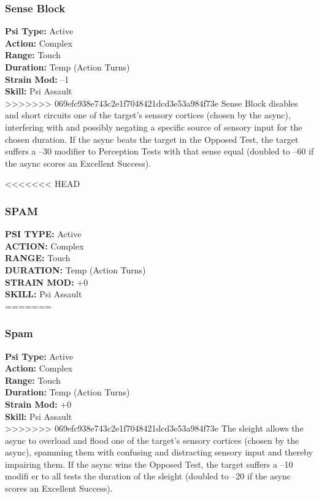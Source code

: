\subsubsection{Sense Block}
\textbf{Psi Type:} Active \\ 
\textbf{Action:} Complex \\ 
\textbf{Range:} Touch \\ 
\textbf{Duration:} Temp (Action Turns) \\
\textbf{Strain Mod:} –1 \\ 
\textbf{Skill:} Psi Assault \\
>>>>>>> 069efc938e743c2e1f7048421dcd3e53a984f73e
Sense Block disables and short circuits one of the target’s
sensory cortices (chosen by the async), interfering
with and possibly negating a specific source of sensory
input for the chosen duration. If the async beats the
target in the Opposed Test, the target suffers a –30
modifier to Perception Tests with that sense equal (doubled
to –60 if the async scores an Excellent Success).


<<<<<<< HEAD
\subsubsection{SPAM}
\textbf{PSI TYPE:} Active \\ 
\textbf{ACTION:} Complex \\ 
\textbf{RANGE:} Touch \\ 
\textbf{DURATION:} Temp (Action Turns) \\
\textbf{STRAIN MOD:} +0 \\ 
\textbf{SKILL:} Psi Assault \\
=======
\subsubsection{Spam}
\textbf{Psi Type:} Active \\ 
\textbf{Action:} Complex \\ 
\textbf{Range:} Touch \\ 
\textbf{Duration:} Temp (Action Turns) \\
\textbf{Strain Mod:} +0 \\ 
\textbf{Skill:} Psi Assault \\
>>>>>>> 069efc938e743c2e1f7048421dcd3e53a984f73e
The sleight allows the async to overload and flood one
of the target’s sensory cortices (chosen by the async),
spamming them with confusing and distracting sensory
input and thereby impairing them. If the async
wins the Opposed Test, the target suffers a –10 modifi
er to all tests the duration of the sleight (doubled to
–20 if the async scores an Excellent Success).

